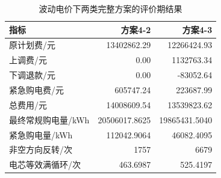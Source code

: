 \begin{table}[H]
\centering\small
\caption{波动电价下两类完整方案的评价期结果}\label{tab:q4-annual}
\begin{tabular}{lrr}
\toprule
指标 & 方案4-2 & 方案4-3\\
\midrule
原计划费/元 & 13402862.29 & 12266424.93\\
上调费/元 & 0.00 & 1132763.34\\
下调退款/元 & 0.00 & -83052.64\\
紧急购电费/元 & 605747.24 & 223687.99\\
总费用/元 & 14008609.54 & 13539823.62\\
最终常规购电量/kWh & 20506017.8625 & 19865431.5040\\
紧急购电量/kWh & 112042.9064 & 46082.4095\\
非空方向反转/次 & 1757 & 6679\\
电芯等效满循环/次 & 463.6987 & 525.4197\\
\bottomrule
\end{tabular}
\end{table}
